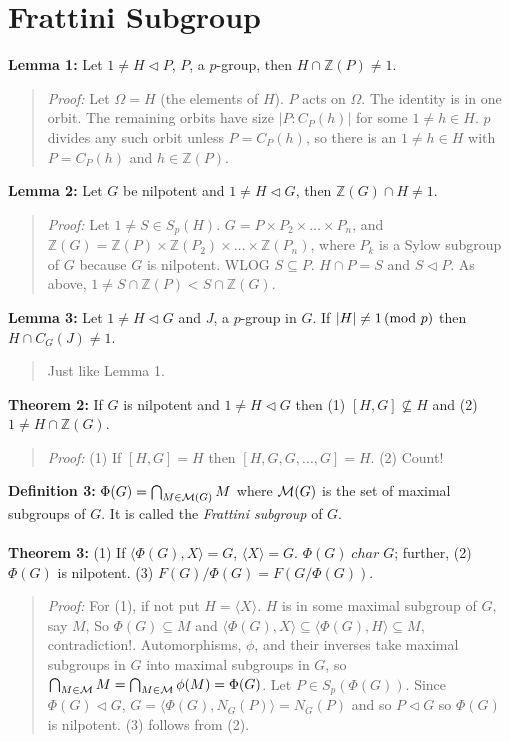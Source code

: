 \section{Frattini Subgroup}
{\bf Lemma 1:} Let $1 \ne H \lhd P$, $P$, a $p$-group, then $H \cap {\mathbb Z}(P) \ne 1$.
\begin{quote}
\emph{Proof:} Let $\Omega =H$ (the elements of $H$).  $P$ acts on $\Omega$.  The
identity is in one orbit.  The remaining orbits have size $|P:C_P(h)|$ for some $1 \ne h \in H$.
$p$ divides any such orbit unless $P=C_P(h)$, so there is an $1 \ne h \in H$ with $P=C_P(h)$ and
$h \in {\mathbb Z}(P)$.
\end{quote}
{\bf Lemma 2:} Let $G$ be nilpotent and $1 \ne H \lhd G$, then ${\mathbb Z}(G) \cap H \ne 1$.
\begin{quote}
\emph{Proof:} Let $1 \ne S \in S_p(H)$. 
$G = P \times P_2 \times \ldots \times P_n$, and
${\mathbb Z}(G) = {\mathbb Z}(P) \times {\mathbb Z} (P_2) \times \ldots \times {\mathbb Z} (P_n)$, 
where $P_k$ is a Sylow subgroup of $G$ because $G$ is nilpotent. WLOG $S \subseteq P$.
$H \cap P =S$ and $S \lhd P$.  As above, $1 \ne S \cap {\mathbb Z}(P) < S \cap {\mathbb Z}(G)$.
\end{quote}
{\bf Lemma 3:} Let $1 \ne H \lhd G$ and $J$, a $p$-group in $G$.  If $|H| \neq 1 \thinspace \textnormal{(mod } p \textnormal{)}$ then
$H \cap C_G(J) \neq 1$.
\begin{quote}
Just like Lemma 1.
\end{quote}
{\bf Theorem 2:} If $G$ is nilpotent and $1 \ne H \lhd G$ then (1) $[H,G] \nsubseteq H$ and
(2) $1 \ne H \cap {\mathbb Z}(G)$.
\begin{quote}
\emph{Proof:} (1) If $[H,G]=H$ then $[H, G, G, \ldots, G]=H$. (2) Count!
\end{quote}
{\bf Definition 3:} $\Phi(G)= \bigcap_{M \in {\cal M}(G)} M$ where ${\cal M}(G)$ is the set of
maximal subgroups of $G$.  
It is called the \emph {Frattini subgroup} of $G$.  
\\
\\
{\bf Theorem 3:} 
(1) If $\langle \Phi(G), X \rangle = G$, $\langle X \rangle = G$.
$\Phi(G) \; char \; G$; further,
(2) $\Phi(G)$ is nilpotent. (3)
$F(G)/\Phi(G)= F(G/\Phi(G))$.
\begin{quote}
\emph{Proof:}  
For (1), if not put $H=\langle X \rangle$.  $H$ is in some maximal subgroup of $G$, say $M$,
So $\Phi(G) \subseteq M$ and $\langle \Phi(G), X \rangle \subseteq \langle \Phi(G), H \rangle \subseteq M$,
contradiction!.
Automorphisms, $\phi$, and their inverses take maximal subgroups in $G$ into
maximal subgroups in $G$, so 
$ \bigcap_{M \in {\cal M}} M = \bigcap_{M \in {\cal M}} \phi(M)= \Phi(G)$.
Let $P \in S_p(\Phi(G))$.  Since $\Phi(G) \lhd G$, $G= \langle \Phi(G), N_G(P) \rangle = N_G(P)$ and so
$P \lhd G$ so $\Phi(G)$ is nilpotent.  (3) follows from (2).
\end{quote}
